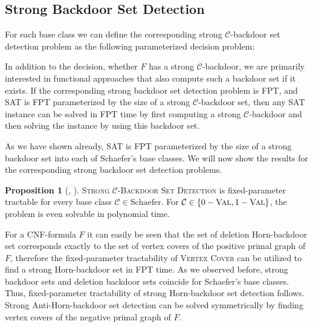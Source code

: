 \documentclass[11pt,a4paper]{article}
\makeatletter
\newcommand{\problemtitle}[1]{\gdef\@problemtitle{#1}}%
\newcommand{\probleminput}[1]{\gdef\@probleminput{#1}}%
\newcommand{\problemquestion}[1]{\gdef\@problemquestion{#1}}%
\newcommand{\problemparam}[1]{\gdef\@problemparam{#1}}%
\theoremstyle{definition}
\theoremstyle{proposition}
\newtheorem{proposition}{Proposition}[section]
\makeatother
\begin{document}
\subsection{Strong Backdoor Set Detection}
\label{sec:strongdetection}
For each base class we can define the corresponding strong $\mathcal{C}$-backdoor set detection problem as the following parameterized decision problem: 
\begin{csproblemparam}
        \problemtitle{Strong $\mathcal{C}$-Backdoor Set Detection}
        \probleminput{A CNF formula $F$ and an integer $k \geq 0$}
        \problemparam{The integer $k$}
        \problemquestion{Does $F$ have a strong $\mathcal{C}$-backdoor set of size at most $k$?}
\end{csproblemparam}
In addition to the decision, whether $F$ has a strong $\mathcal{C}$-backdoor, we are primarily interested in functional approaches that also compute such a backdoor set if it exists. If the corresponding strong backdoor set detection problem is FPT, and SAT is FPT parameterized by the size of a strong $\mathcal{C}$-backdoor set, then any SAT instance can be solved in FPT time by first computing a strong $\mathcal{C}$-backdoor and then solving the instance by using this backdoor set. 

As we have shown already, SAT is FPT parameterized by the size of a strong backdoor set into each of Schaefer's base classes. We will now show the results for the corresponding strong backdoor set detection problems.
\begin{proposition}[{\cite[Proposition 5, p.297]{Gaspers2012}}, {\cite{Nishimura}}]
\textsc{Strong $\mathcal{C}$-Backdoor Set Detection} is fixed-parameter tractable for every base class $\mathcal{C} \in \text{Schaefer}$. For $\mathcal{C} \in \{0-\textsc{Val}, 1-\textsc{Val}\}$, the problem is even solvable in polynomial time. 
\end{proposition}

For a CNF-formula $F$ it can easily be seen that the set of deletion Horn-backdoor set corresponds exactly to the set of vertex covers of the positive primal graph of $F$, therefore the fixed-parameter tractability of \textsc{Vertex Cover} can be utilized to find a strong Horn-backdoor set in FPT time. As we observed before, strong backdoor sets and deletion backdoor sets coincide for Schaefer's base classes. Thus, fixed-parameter tractability of strong Horn-backdoor set detection follows. Strong Anti-Horn-backdoor set detection can be solved symmetrically by finding vertex covers of the negative primal graph of $F$.  
\end{document}
